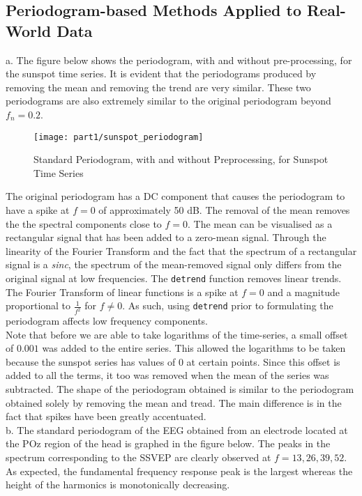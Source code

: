 \subsection{Periodogram-based Methods Applied to Real-World Data}

\noindent{}a. The figure below shows the periodogram, with and without pre-processing, for the sunspot time series. It is evident that the periodograms produced by removing the mean and removing the trend are very similar. These two periodograms are also extremely similar to the original periodogram beyond $f_n=0.2$.

\begin{figure}[H]
\centering{}
\texttt{[image: part1/sunspot\_periodogram]}
\caption{Standard Periodogram, with and without Preprocessing, for Sunspot Time Series}
\end{figure}

\noindent{}The original periodogram has a DC component that causes the periodogram to have a spike at $f=0$ of approximately 50 dB. The removal of the mean removes the the spectral components close to $f=0$. The mean can be visualised as a rectangular signal that has been added to a zero-mean signal. Through the linearity of the Fourier Transform and the fact that the spectrum of a rectangular signal is a \textit{sinc}, the spectrum of the mean-removed signal only differs from the original signal at low frequencies. The \texttt{detrend} function removes linear trends. The Fourier Transform of linear functions is a spike at $f=0$ and a magnitude proportional to $\frac{1}{f^2}$ for $f \neq 0$. As such, using \texttt{detrend} prior to formulating the periodogram affects low frequency components. \\

\noindent{}Note that before we are able to take logarithms of the time-series, a small offset of $0.001$ was added to the entire series. This allowed the logarithms to be taken because the sunspot series has values of $0$ at certain points. Since this offset is added to all the terms, it too was removed when the mean of the series was subtracted. The shape of the periodogram obtained is similar to the periodogram obtained solely by removing the mean and tread. The main difference is in the fact that spikes have been greatly accentuated. \\

\noindent{}b. The standard periodogram of the EEG obtained from an electrode located at the POz region of the head is graphed in the figure below. The peaks in the spectrum corresponding to the SSVEP are clearly observed at $f=13,26,39,52$. As expected, the fundamental frequency response peak is the largest whereas the height of the harmonics is monotonically decreasing.

